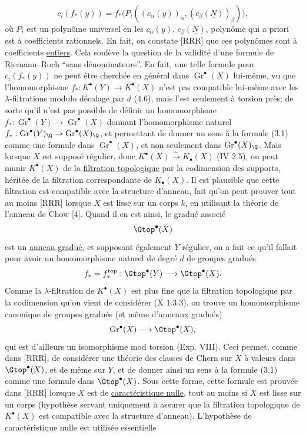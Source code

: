 
\begin{equation}\tag{3.1}
 c_i(f_*(y))=f_*\bigl(P_i((c_\alpha(y))_\alpha,(c_\beta(\underline N))_\beta)\bigr),
\end{equation}
où $P_i$ est un polynôme universel en les $c_\alpha(y)$, $c_\beta(\underline N)$, polynôme qui a priori est à coefficients rationnels. En fait, on constate [RRR] que ces polynômes sont à coefficients \uline{entiers}. Cela soulève la question de la validité d'une formule de Riemann--Roch ``sans dénominateurs''. En fait, une telle formule pour $c_i(f_*(y))$ ne peut être cherchée en général dans $\operatorname{Gr}^\bullet(X)$ lui-même, vu que l'homomorphisme $f_*:K^\bullet(Y)\to K^\bullet(X)$ n'est pas compatible lui-même avec les $\lambda$-filtrations modulo décalage par $d$ (4.6), mais l'est seulement à torsion près; de sorte qu'il n'est pas possible de définir un homomorphisme $f_*:\operatorname{Gr}^\bullet(Y)\longrightarrow \operatorname{Gr}^\bullet(X)$ donnant l'homomorphisme naturel $f_*:\operatorname{Gr}^\bullet(Y)_\Q\to\operatorname{Gr}^\bullet(X)_\Q$, et permettant de donner un sens à la formule (3.1) comme une formule dans $\operatorname{Gr}^\bullet(X)$, et non seulement dans $\operatorname{Gr}^\bullet(X)_\Q$. Mais lorsque $X$ est supposé régulier, donc $K^\bullet(X)\xrightarrow{\sim} K_\bullet(X)$ (IV 2.5), on peut munir $K^\bullet(X)$ de la \uline{filtration topologique} par la codimension des supports, héritée de la filtration correspondante de $K_\bullet(X)$. Il est plausible que cette filtration est compatible avec la structure d'anneau, fait qu'on peut prouver tout au moins [RRR] lorsque $X$ est lisse sur un corps $k$, en utilisant la théorie de l'anneau de Chow [4]. Quand il en est ainsi, le gradué associé
\[
 \Gtop^\bullet(X)
\]
est un \uline{anneau gradué}, et supposant également $Y$ régulier, on a fait ce qu'il fallait pour avoir un homomorphisme naturel de degré $d$ de groupes gradués
\[
 f_*=f_*^{\mathrm{top}}:\Gtop^\bullet(Y)\longrightarrow \Gtop^\bullet(X).
\]
Comme la $\lambda$-filtration de $K^\bullet(X)$ est plus fine que la filtration topologique par la codimension qu'on vient de considérer (X 1.3.3), on trouve un homomorphisme canonique de groupes gradués (et même d'anneaux gradués)
\[
 \operatorname{Gr}^\bullet(X)\longrightarrow \Gtop^\bullet(X),
\]
qui est d'ailleurs un isomorphisme mod torsion (Exp. VIII). Ceci permet, comme dans [RRR], de considérer une théorie des classes de Chern sur $X$ à valeurs dans $\Gtop^\bullet(X)$, et de même sur $Y$, et de donner ainsi un sens à la formule (3.1) comme une formule dans $\Gtop^\bullet(X)$. Sous cette forme, cette formule est prouvée dans [RRR] lorsque $X$ est de \uline{caractéristique nulle}, tout au moins si $X$ est lisse sur un corps (hypothèse servant uniquement à assurer que la filtration topologique de $K^\bullet(X)$ est compatible avec la structure d'anneau). L'hypothèse de caractéristique nulle est utilisée
essentielle%
